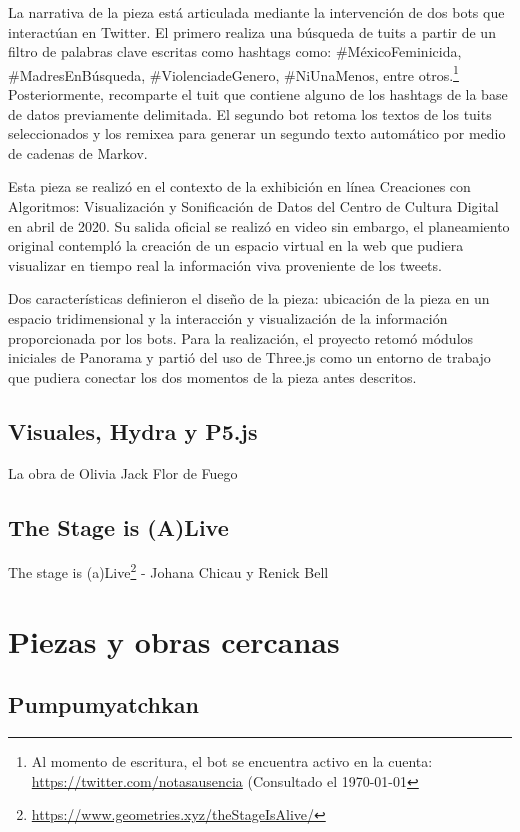 La narrativa de la pieza está articulada mediante la intervención de dos bots que interactúan en Twitter. El primero realiza una búsqueda de tuits a partir de un filtro de palabras clave escritas como hashtags como: \#MéxicoFeminicida, \#MadresEnBúsqueda, \#ViolenciadeGenero, \#NiUnaMenos, entre otros.\footnote{Al momento de escritura, el bot se encuentra activo en la cuenta: \url{https://twitter.com/notasausencia} (Consultado el \today} Posteriormente, recomparte el tuit que contiene alguno de los hashtags de la base de datos previamente delimitada. El segundo bot retoma los textos de los tuits seleccionados y los remixea para generar un segundo texto automático por medio de cadenas de Markov.

Esta pieza se realizó en el contexto de la exhibición en línea Creaciones con Algoritmos: Visualización y Sonificación de Datos del Centro de Cultura Digital en abril de 2020. Su salida oficial se realizó en video sin embargo, el planeamiento original contempló la creación de un espacio virtual en la web que pudiera visualizar en tiempo real la información viva proveniente de los tweets.

Dos características definieron el diseño de la pieza: ubicación de la pieza en un espacio tridimensional y la interacción y visualización de la información proporcionada por los bots. Para la realización, el proyecto retomó módulos iniciales de Panorama y partió del uso de Three.js como un entorno de trabajo que pudiera conectar los dos momentos de la pieza antes descritos.

\subsection{Visuales, Hydra y P5.js}

La obra de Olivia Jack
Flor de Fuego 

\subsection{The Stage is (A)Live}

The stage is (a)Live\footnote{\url{https://www.geometries.xyz/theStageIsAlive/}} - Johana Chicau y Renick Bell

\section{Piezas y obras cercanas} %

\subsection{Pumpumyatchkan}

